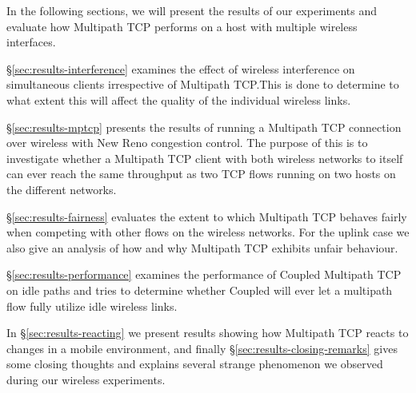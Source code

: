 In the following sections, we will present the results of our experiments and
evaluate how Multipath TCP performs on a host with multiple wireless
interfaces.

\S\ref{sec:results-interference} examines the effect of wireless
interference on simultaneous clients irrespective of Multipath TCP.\@ This is
done to determine to what extent this will affect the quality of the individual
wireless links.

\S\ref{sec:results-mptcp} presents the results of running a Multipath TCP
connection over wireless with New Reno congestion control. The purpose of this
is to investigate whether a Multipath TCP client with both wireless networks to
itself can ever reach the same throughput as two TCP flows running on two hosts
on the different networks.

\S\ref{sec:results-fairness} evaluates the extent to which Multipath TCP behaves
fairly when competing with other flows on the wireless networks. For the uplink
case we also give an analysis of how and why Multipath TCP exhibits unfair
behaviour.

\S\ref{sec:results-performance} examines the performance of Coupled Multipath
TCP on idle paths and tries to determine whether Coupled will ever let a
multipath flow fully utilize idle wireless links.

In \S\ref{sec:results-reacting} we present results showing how Multipath TCP
reacts to changes in a mobile environment, and finally
\S\ref{sec:results-closing-remarks} gives some closing thoughts and explains
several strange phenomenon we observed during our wireless experiments.
